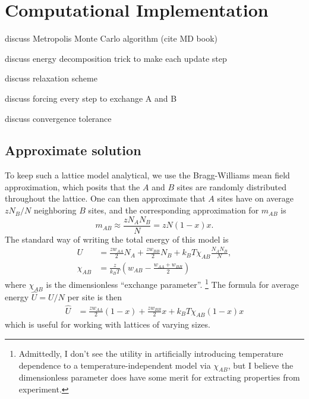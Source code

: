 \documentclass[10pt]{article}
\begin{document}
\section{Computational Implementation}
discuss Metropolis Monte Carlo algorithm (cite MD book)

discuss energy decomposition trick to make each update step

discuss relaxation scheme

discuss forcing every step to exchange A and B

discuss convergence tolerance


\subsection{Approximate solution}
To keep such a lattice model analytical, we use the Bragg-Williams mean field approximation, which posits that the $A$ and $B$ sites are randomly distributed throughout the lattice.
One can then approximate that $A$ sites have on average $z N_B / N$ neighboring $B$ sites, and the corresponding approximation for $m_{AB}$ is
\begin{equation}
    m_{AB} \approx \frac{z N_A N_B}{N} = z N (1-x) x.
\end{equation}
The standard way of writing the total energy of this model is
\begin{align}
    U &=
    \frac{z w_{AA}}{2} N_A +
    \frac{z w_{BB}}{2} N_B +
    k_B T \chi_{AB} \frac{N_A N_B}{N}, \\
    \chi_{AB} &=
    \frac{z}{k_B T} \left( w_{AB} - \frac{w_{AA} + w_{BB}}{2} \right)
\end{align}
where $\chi_{AB}$ is the dimensionless ``exchange parameter''. \footnote{Admittedly, I don't see the utility in artificially introducing temperature dependence to a temperature-independent model via $\chi_{AB}$, but I believe the dimensionless parameter does have some merit for extracting properties from experiment.}
The formula for average energy $\hat{U}=U/N$ per site is then
\begin{align}
    \hat{U} &=
    \frac{z w_{AA}}{2} (1-x) +
    \frac{z w_{BB}}{2} x +
    k_B T \chi_{AB} (1-x) x
\end{align}
which is useful for working with lattices of varying sizes.
\end{document}
